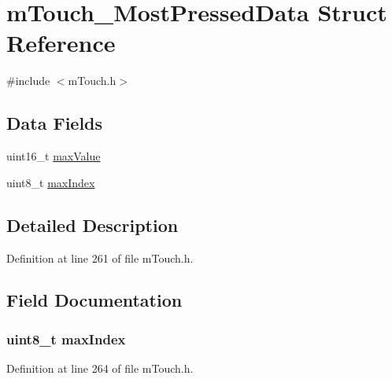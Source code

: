 \hypertarget{structm_touch___most_pressed_data}{}\section{m\+Touch\+\_\+\+Most\+Pressed\+Data Struct Reference}
\label{structm_touch___most_pressed_data}


{\ttfamily \#include $<$m\+Touch.\+h$>$}

\subsection*{Data Fields}
\begin{DoxyCompactItemize}
\item 
uint16\+\_\+t \hyperlink{structm_touch___most_pressed_data_a43e908ef446b8955bd26ea7c5a246ceb}{max\+Value}
\item 
uint8\+\_\+t \hyperlink{structm_touch___most_pressed_data_a3a05b321a26c2f84ecd1600196402101}{max\+Index}
\end{DoxyCompactItemize}


\subsection{Detailed Description}


Definition at line 261 of file m\+Touch.\+h.



\subsection{Field Documentation}
\hypertarget{structm_touch___most_pressed_data_a3a05b321a26c2f84ecd1600196402101}{}
\subsubsection[{max\+Index}]{\setlength{\rightskip}{0pt plus 5cm}uint8\+\_\+t max\+Index}\label{structm_touch___most_pressed_data_a3a05b321a26c2f84ecd1600196402101}


Definition at line 264 of file m\+Touch.\+h.

\hypertarget{structm_touch___most_pressed_data_a43e908ef446b8955bd26ea7c5a246ceb}{}
